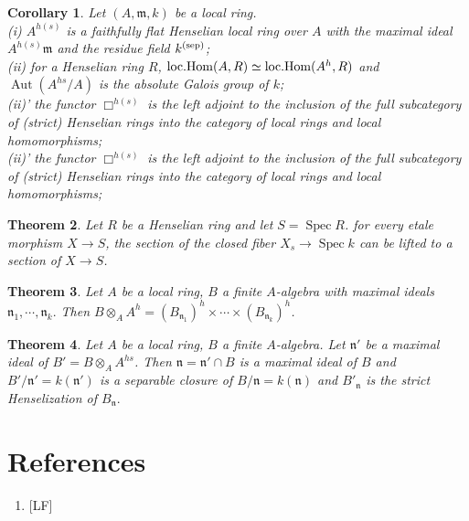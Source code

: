 \documentclass{article}
\theoremstyle{theorem}
\newtheorem{theorem}{Theorem}[section]
\newtheorem{corollary}[theorem]{Corollary}
\begin{document}
    \begin{corollary} Let $(A, \mathfrak{m}, k)$ be a local ring.\\
        {\rm (i)} $A^{h(s)}$ is a faithfully flat Henselian local ring over $A$ with the maximal ideal $A^{h(s)}\mathfrak{m}$ and the residue field $k^{\rm(sep)}$;\\
        {\rm (ii)} for a Henselian ring $R$, ${\rm loc.Hom}(A, R) \simeq {\rm loc.Hom}(A^h, R)$ and $\operatorname{Aut}(A^{hs}/A)$ is the absolute Galois group of $k$;\\
        {\rm (ii)'} the functor $\Box^{h(s)}$ is the left adjoint to the inclusion of the full subcategory of (strict) Henselian rings into the category of local rings and local homomorphisms;\\
        {\rm (ii)'} the functor $\Box^{h(s)}$ is the left adjoint to the inclusion of the full subcategory of (strict) Henselian rings into the category of local rings and local homomorphisms;
    \end{corollary}
    
    \begin{theorem}
        Let $R$ be a Henselian ring and let $S = \operatorname{Spec} R$.
        for every etale morphism $X \rightarrow S$, the section of the closed fiber $X_s \rightarrow \operatorname{Spec} k$ can be lifted to a section of $X \rightarrow S$.
    \end{theorem}
    
    \begin{theorem}
        Let $A$ be a local ring, $B$ a finite $A$-algebra with maximal ideals $\mathfrak{n}_1, \cdots, \mathfrak{n}_k.$ Then $B \otimes_A A^h = (B_{\mathfrak{n}_1})^h \times \cdots \times (B_{\mathfrak{n}_k})^h$.
    \end{theorem}
    
    \begin{theorem}
        Let $A$ be a local ring, $B$ a finite $A$-algebra. Let $\mathfrak{n}'$ be a maximal ideal of $B' = B \otimes_A A^{hs}$. Then $\mathfrak{n} = \mathfrak{n}'\cap B$ is a maximal ideal of $B$ and $B'/\mathfrak{n}' = k(\mathfrak{n}')$ is a separable closure of $B/\mathfrak{n} = k(\mathfrak{n})$ and $B'_\mathfrak{n}$ is the strict Henselization of $B_\mathfrak{n}.$
    \end{theorem}
    
    \section{References}
    \begin{enumerate}[]
        \item {[LF]} 
    \end{enumerate}
\end{document}
